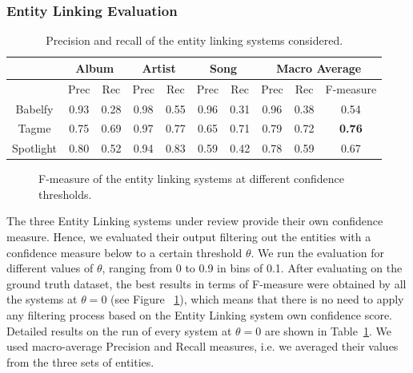 \subsubsection{Entity Linking Evaluation}

\begin{table}[]
\scriptsize
\centering
	\begin{tabular}{ c c c c c c c c c c }
	\hline
& \multicolumn{2}{c}{Album} & \multicolumn{2}{c}{Artist} & \multicolumn{2}{c}{Song} & \multicolumn{3}{c}{Macro Average}  \\
\hline
	& Prec & Rec & Prec & Rec & Prec & Rec & Prec & Rec & F-measure \\
	\hline
Babelfy & 0.93 & 0.28 & 0.98 & 0.55 & 0.96 & 0.31 & 0.96 & 0.38 & 0.54 \\
Tagme & 0.75 & 0.69 & 0.97 & 0.77 & 0.65 & 0.71 & 0.79 & 0.72 & \textbf{0.76} \\
Spotlight & 0.80 & 0.52 & 0.94 & 0.83 & 0.59 & 0.42 & 0.78 & 0.59 & 0.67 \\
\hline
	\end{tabular}
	\caption{Precision and recall of the entity linking systems considered.}
	\label{tbl:kb:res_categories}
\end{table}

\begin{figure}[!htp]
\centerline{}
\caption[F-measure of the entity linking systems at different thresholds.]{F-measure of the entity linking systems at different confidence thresholds.}
\label{fig:kb:confidence_el}
\end{figure}

The three Entity Linking systems under review provide their own confidence measure. Hence, we evaluated their output filtering out the entities with a confidence measure below to a certain threshold $\theta$. We run the evaluation for different values of $\theta$, ranging from 0 to 0.9 in bins of 0.1. After evaluating on the ground truth dataset, the best results in terms of F-measure were obtained by all the systems at $\theta = 0$ (see Figure ~\ref{fig:kb:confidence_el}), which means that there is no need to apply any filtering process based on the Entity Linking system own confidence score. Detailed results on the run of every system at $\theta = 0$ are shown in Table~\ref{tbl:kb:res_categories}. We used macro-average Precision and Recall measures, i.e. we averaged their values from the three sets of entities.

